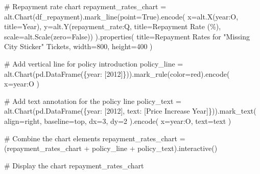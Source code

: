 \documentclass[
  letterpaper,
  DIV=11,
  numbers=noendperiod]{scrartcl}
\newenvironment{Shaded}{\begin{snugshade}}{\end{snugshade}}
\newcommand{\CommentTok}[1]{\textcolor[rgb]{0.37,0.37,0.37}{#1}}
\newcommand{\DecValTok}[1]{\textcolor[rgb]{0.68,0.00,0.00}{#1}}
\newcommand{\NormalTok}[1]{\textcolor[rgb]{0.00,0.23,0.31}{#1}}
\newcommand{\OperatorTok}[1]{\textcolor[rgb]{0.37,0.37,0.37}{#1}}
\newcommand{\StringTok}[1]{\textcolor[rgb]{0.13,0.47,0.30}{#1}}
\newcommand{\VariableTok}[1]{\textcolor[rgb]{0.07,0.07,0.07}{#1}}
\begin{document}
\begin{Shaded}
\begin{Highlighting}[]
\CommentTok{\# Repayment rate chart}
\NormalTok{repayment\_rates\_chart }\OperatorTok{=}\NormalTok{ alt.Chart(df\_repayment).mark\_line(point}\OperatorTok{=}\VariableTok{True}\NormalTok{).encode(}
\NormalTok{    x}\OperatorTok{=}\NormalTok{alt.X(}\StringTok{\textquotesingle{}year:O\textquotesingle{}}\NormalTok{, title}\OperatorTok{=}\StringTok{\textquotesingle{}Year\textquotesingle{}}\NormalTok{),}
\NormalTok{    y}\OperatorTok{=}\NormalTok{alt.Y(}\StringTok{\textquotesingle{}repayment\_rate:Q\textquotesingle{}}\NormalTok{, title}\OperatorTok{=}\StringTok{\textquotesingle{}Repayment Rate (\%)\textquotesingle{}}\NormalTok{, scale}\OperatorTok{=}\NormalTok{alt.Scale(zero}\OperatorTok{=}\VariableTok{False}\NormalTok{))}
\NormalTok{).properties(}
\NormalTok{    title}\OperatorTok{=}\StringTok{\textquotesingle{}Repayment Rates for "Missing City Sticker" Tickets\textquotesingle{}}\NormalTok{,}
\NormalTok{    width}\OperatorTok{=}\DecValTok{800}\NormalTok{,}
\NormalTok{    height}\OperatorTok{=}\DecValTok{400}
\NormalTok{)}

\CommentTok{\# Add vertical line for policy introduction}
\NormalTok{policy\_line }\OperatorTok{=}\NormalTok{ alt.Chart(pd.DataFrame(\{}\StringTok{\textquotesingle{}year\textquotesingle{}}\NormalTok{: [}\DecValTok{2012}\NormalTok{]\})).mark\_rule(color}\OperatorTok{=}\StringTok{\textquotesingle{}red\textquotesingle{}}\NormalTok{).encode(}
\NormalTok{    x}\OperatorTok{=}\StringTok{\textquotesingle{}year:O\textquotesingle{}}
\NormalTok{)}

\CommentTok{\# Add text annotation for the policy line}
\NormalTok{policy\_text }\OperatorTok{=}\NormalTok{ alt.Chart(pd.DataFrame(\{}\StringTok{\textquotesingle{}year\textquotesingle{}}\NormalTok{: [}\DecValTok{2012}\NormalTok{], }\StringTok{\textquotesingle{}text\textquotesingle{}}\NormalTok{: [}\StringTok{\textquotesingle{}Price Increase Year\textquotesingle{}}\NormalTok{]\})).mark\_text(}
\NormalTok{    align}\OperatorTok{=}\StringTok{\textquotesingle{}right\textquotesingle{}}\NormalTok{,}
\NormalTok{    baseline}\OperatorTok{=}\StringTok{\textquotesingle{}top\textquotesingle{}}\NormalTok{,}
\NormalTok{    dx}\OperatorTok{=}\DecValTok{3}\NormalTok{,}
\NormalTok{    dy}\OperatorTok{=}\DecValTok{2}
\NormalTok{).encode(}
\NormalTok{    x}\OperatorTok{=}\StringTok{\textquotesingle{}year:O\textquotesingle{}}\NormalTok{,}
\NormalTok{    text}\OperatorTok{=}\StringTok{\textquotesingle{}text\textquotesingle{}}
\NormalTok{)}

\CommentTok{\# Combine the chart elements}
\NormalTok{repayment\_rates\_chart }\OperatorTok{=}\NormalTok{ (repayment\_rates\_chart }\OperatorTok{+}\NormalTok{ policy\_line }\OperatorTok{+}\NormalTok{ policy\_text).interactive()}

\CommentTok{\# Display the chart}
\NormalTok{repayment\_rates\_chart}
\end{Highlighting}
\end{Shaded}
\end{document}
